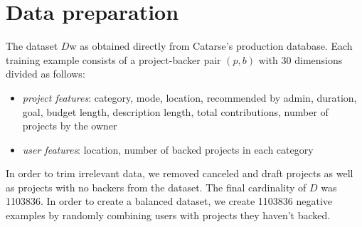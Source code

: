 \documentclass[cic,tc,english]{iiufrgs}
\begin{document}
\chapter{Data preparation}
The dataset \(D\)w as obtained directly from Catarse's production database. Each training example consists of a project-backer pair \((p,b)\) with 30 dimensions divided as follows:
\begin{itemize}
    \item \emph{project features}: category, mode, location, recommended by admin, duration, goal, budget length, description length, total contributions, number of projects by the owner
    \item \emph{user features}: location, number of backed projects in each category
\end{itemize}

In order to trim irrelevant data, we removed canceled and draft projects as well as projects with no backers from the dataset. The final cardinality of \(D\) was 1103836. In order to create a balanced dataset, we create 1103836 negative examples by randomly combining users with projects they haven't backed.




% 


{}
\end{document}
